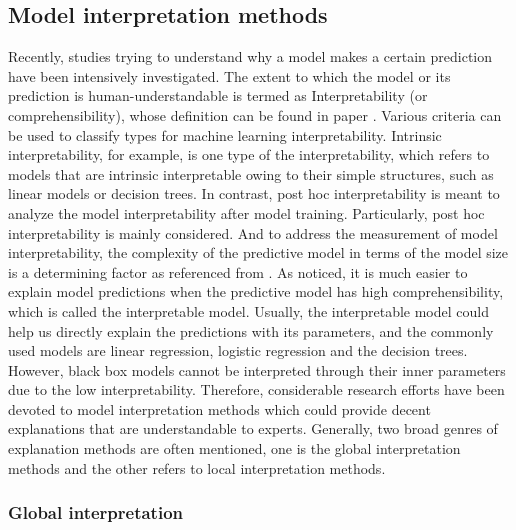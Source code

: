\subsection{Model interpretation methods}
Recently, studies trying to understand why a model makes a certain prediction have been intensively investigated. The extent to which the model or its prediction is human-understandable is termed as Interpretability (or comprehensibility), whose definition can be found in paper \cite{kim2016examples}. Various criteria can be used to classify types for machine learning interpretability. Intrinsic interpretability, for example, is one type of the interpretability, which refers to models that are intrinsic interpretable owing to their simple structures, such as linear models or decision trees. In contrast, post hoc interpretability is meant to analyze the model interpretability after model training. Particularly, post hoc interpretability is mainly considered. And to address the measurement of model interpretability, the complexity of the predictive model in terms of the model size is a determining factor as referenced from \cite{freitas2014comprehensible}. As noticed, it is much easier to explain model predictions when the predictive model has high comprehensibility, which is called the interpretable model. Usually, the interpretable model could help us directly explain the predictions with its parameters, and the commonly used models are linear regression, logistic regression and the decision trees. However, black box models cannot be interpreted through their inner parameters due to the low interpretability. Therefore, considerable research efforts have been devoted to model interpretation methods which could provide decent explanations that are understandable to experts. Generally, two broad genres of explanation methods are often mentioned, one is the global interpretation methods and the other refers to local interpretation methods.


\subsubsection{Global interpretation}


